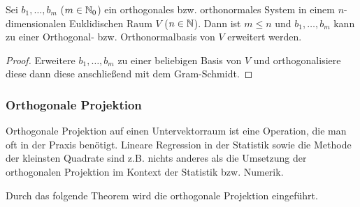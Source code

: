 \begin{klr}
	Sei $ b_1, \ldots, b_m $ ($ m \in \mathbb N_0 $) ein orthogonales bzw. orthonormales System in einem $ n $-dimensionalen Euklidischen Raum $ V $ ($ n \in \mathbb N $). Dann ist $ m \leq n $ und $ b_1, \ldots, b_m $ kann zu einer Orthogonal- bzw. Orthonormalbasis von $ V $ erweitert werden.
\end{klr}
\begin{proof}
	Erweitere $ b_1, \ldots, b_m $ zu einer beliebigen Basis von $ V $ und orthogonalisiere diese dann diese anschließend mit dem Gram-Schmidt.
\end{proof}

\subsubsection{Orthogonale Projektion}

Orthogonale Projektion auf einen Untervektorraum ist eine Operation, die man oft in der Praxis benötigt. Lineare Regression in der Statistik sowie die Methode der kleinsten Quadrate sind z.B. nichts anderes als die Umsetzung der orthogonalen Projektion im Kontext der Statistik bzw. Numerik. 

Durch das folgende Theorem wird die orthogonale Projektion eingeführt. 

